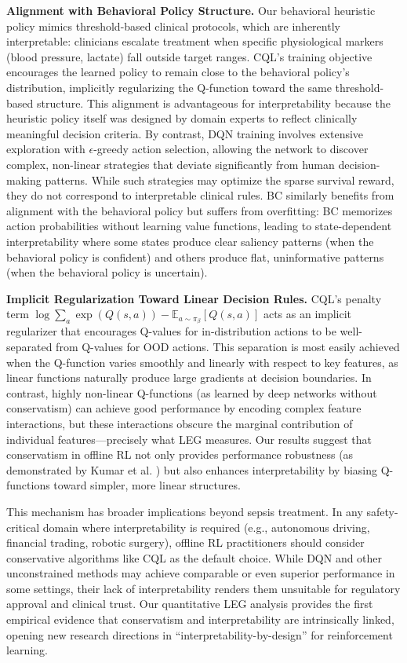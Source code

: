 \textbf{Alignment with Behavioral Policy Structure.} Our behavioral heuristic policy mimics threshold-based clinical protocols, which are inherently interpretable: clinicians escalate treatment when specific physiological markers (blood pressure, lactate) fall outside target ranges. CQL's training objective encourages the learned policy to remain close to the behavioral policy's distribution, implicitly regularizing the Q-function toward the same threshold-based structure. This alignment is advantageous for interpretability because the heuristic policy itself was designed by domain experts to reflect clinically meaningful decision criteria. By contrast, DQN training involves extensive exploration with $\epsilon$-greedy action selection, allowing the network to discover complex, non-linear strategies that deviate significantly from human decision-making patterns. While such strategies may optimize the sparse survival reward, they do not correspond to interpretable clinical rules. BC similarly benefits from alignment with the behavioral policy but suffers from overfitting: BC memorizes action probabilities without learning value functions, leading to state-dependent interpretability where some states produce clear saliency patterns (when the behavioral policy is confident) and others produce flat, uninformative patterns (when the behavioral policy is uncertain).

\textbf{Implicit Regularization Toward Linear Decision Rules.} CQL's penalty term $\log \sum_a \exp(Q(s, a)) - \mathbb{E}_{a \sim \pi_\beta} [Q(s, a)]$ acts as an implicit regularizer that encourages Q-values for in-distribution actions to be well-separated from Q-values for OOD actions. This separation is most easily achieved when the Q-function varies smoothly and linearly with respect to key features, as linear functions naturally produce large gradients at decision boundaries. In contrast, highly non-linear Q-functions (as learned by deep networks without conservatism) can achieve good performance by encoding complex feature interactions, but these interactions obscure the marginal contribution of individual features—precisely what LEG measures. Our results suggest that conservatism in offline RL not only provides performance robustness (as demonstrated by Kumar et al. \citeyearpar{kumar2020cql}) but also enhances interpretability by biasing Q-functions toward simpler, more linear structures.

This mechanism has broader implications beyond sepsis treatment. In any safety-critical domain where interpretability is required (e.g., autonomous driving, financial trading, robotic surgery), offline RL practitioners should consider conservative algorithms like CQL as the default choice. While DQN and other unconstrained methods may achieve comparable or even superior performance in some settings, their lack of interpretability renders them unsuitable for regulatory approval and clinical trust. Our quantitative LEG analysis provides the first empirical evidence that conservatism and interpretability are intrinsically linked, opening new research directions in ``interpretability-by-design'' for reinforcement learning.


